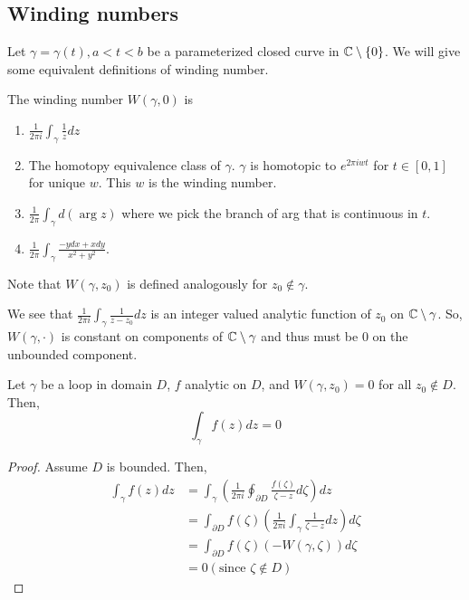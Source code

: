 \documentclass[11pt,leqno,oneside]{amsart}
\numberwithin{thm}{section}
\begin{document}
  \subsection*{Winding numbers}
  Let $\gamma = \gamma(t), a < t < b$ be a parameterized closed curve
  in ${\mathbb C} \setminus \{0\}$. We will give some equivalent definitions of
  winding number.
  \begin{defn}
    The winding number $W(\gamma,0)$ is
    \begin{enumerate}
    \item $\frac{1}{2\pi i} \int_\gamma \frac{1}{z}dz$
    \item The homotopy equivalence class of $\gamma$. $\gamma$ is
      homotopic to $e^{2\pi i wt}$ for $t \in [0,1]$ for unique
      $w$. This $w$ is the winding number.
    \item $\frac{1}{2 \pi} \int_\gamma d(\arg z)$ where we pick the
      branch of arg that is continuous in $t$.
    \item $\frac{1}{2\pi} \int_\gamma \frac{-ydx + xdy}{x^2+y^2}$.
    \end{enumerate}
    Note that $W(\gamma, z_0)$ is defined analogously for $z_0 \not
    \in \gamma$.
  \end{defn}
  We see that $\frac{1}{2\pi i} \int_\gamma \frac{1}{z-z_0}dz$ is an
  integer valued analytic function of $z_0$ on ${\mathbb C} \setminus \gamma$. So, $W(\gamma,
  \cdot)$ is constant on components of ${\mathbb C} \setminus \gamma$ and thus
  must be 0 on the unbounded component.
  \begin{thm}
    Let $\gamma$ be a loop in domain $D$, $f$ analytic on $D$, and
    $W(\gamma,z_0) = 0$ for all $z_0 \not \in D$. Then, \[
      \int_\gamma f(z)dz = 0
    \]
  \end{thm}
  \begin{proof}
    Assume $D$ is bounded. Then,
    \begin{align*}
      \int_\gamma f(z)dz & = \int_\gamma \left( \frac{1}{2\pi i}
                           \oint_{\partial D} \frac{f(\zeta)}{\zeta -
                           z} d\zeta \right) dz \\
      & = \int_{\partial D} f(\zeta) \left( \frac{1}{2\pi i}
        \int_\gamma \frac{1}{\zeta - z} dz \right) d\zeta \\
                         & = \int_{\partial D} f(\zeta) (- W(\gamma, \zeta)) d\zeta \\
      & = 0 (\text{since } \zeta \not \in D)
    \end{align*}
  \end{proof}
\end{document}
